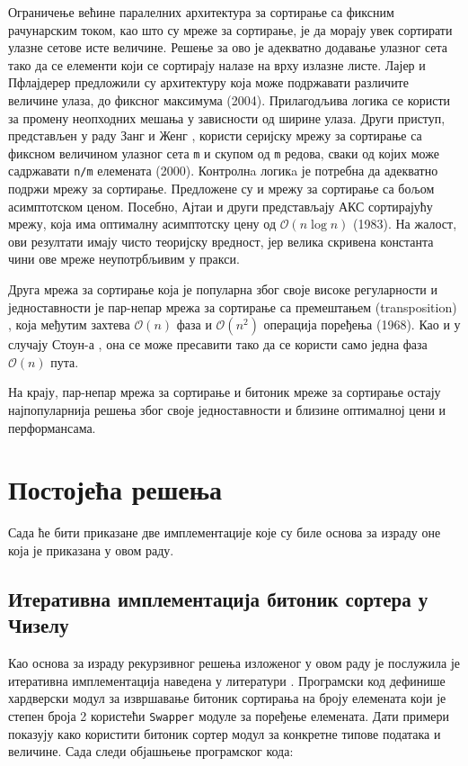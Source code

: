 \documentclass[12pt, a4paper]{article}
\theoremstyle{definition}
\begin{document}
Ограничење већине паралелних архитектура за сортирање са фиксним рачунарским током, као што су мреже за сортирање, је да морају увек сортирати улазне сетове исте величине. Решење за ово је адекватно додавање улазног сета тако да се елементи који се сортирају налазе на врху излазне листе. Лајер и Пфлајдерер \cite{layer04} предложили су архитектуру која може подржавати различите величине улаза, до фиксног максимума (2004). Прилагодљива логика се користи за промену неопходних мешања у зависности од ширине улаза. Други приступ, представљен у раду Занг и Женг \cite{zang}, користи серијску мрежу за сортирање са фиксном величином улазног сета \verb+m+ и скупом од \verb+m+ редова, сваки од којих може садржавати \verb+n/m+ елемената (2000). Контролнa логикa је потребна да адекватно подржи мрежу за сортирање.
Предложене су и мрежу за сортирање са бољом асимптотском ценом. Посебно, Ајтаи и други \cite{aitan} представљају АКС сортирајућу мрежу, која има оптималну асимптотску цену од $\mathcal{O}(n\log n)$ (1983). На жалост, ови резултати имају чисто теоријску вредност, јер велика скривена константа чини ове мреже неупотрбљивим у пракси.

Друга мрежа за сортирање која је популарна због своје високе регуларности и једноставности је пар-непар мрежа за сортирање са премештањем (transposition) \cite{knuth}, која међутим захтева $\mathcal{O}(n)$ фаза и $\mathcal{O}(n^2)$ операција поређења (1968). Као и у случају Стоун-а \cite{stone}, она се може пресавити тако да се користи само једна фаза $\mathcal{O}(n)$ пута.

На крају, пар-непар мрежа за сортирање и битоник мреже за сортирање остају најпопуларнија решења због своје једноставности и близине оптималној цени и перформансама.

\newpage

\section{Постојећа решења}

Сада ће бити приказане две имплементације које су биле основа за израду оне која је приказана у овом раду.

\subsection{Итеративна имплементација битоник сортера у Чизелу}
Као основа за израду рекурзивног решења изложеног у овом раду је послужила је итеративна имплементација наведена у литератури \cite{git_freeChipsBitonic}.
Програмски код дефинише хардверски модул за извршавање битоник сортирања на броју елемената који је степен броја 2 користећи \verb+Swapper+ модуле за поређење елемената. Дати примери показују како користити битоник сортер модул за конкретне типове података и величине. Сада следи објашњење програмског кода:
\end{document}
